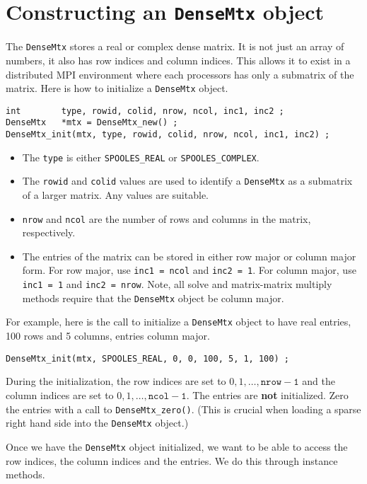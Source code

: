 \section{Constructing an {\tt DenseMtx} object}
\label{subsection:construct-DenseMtx}
\par
The {\tt DenseMtx} stores a real or complex dense matrix.
It is not just an array of numbers, it also has row indices and
column indices.
This allows it to exist in a distributed MPI environment where each
processors has only a submatrix of the matrix.
Here is how to initialize a {\tt DenseMtx} object.
\begin{verbatim}
int        type, rowid, colid, nrow, ncol, inc1, inc2 ;
DenseMtx   *mtx = DenseMtx_new() ;
DenseMtx_init(mtx, type, rowid, colid, nrow, ncol, inc1, inc2) ;
\end{verbatim}
\begin{itemize}
\item
The {\tt type} is either {\tt SPOOLES\_REAL} 
or {\tt SPOOLES\_COMPLEX}.
\item
The {\tt rowid} and {\tt colid} values are used to identify a 
{\tt DenseMtx} as a submatrix of a larger matrix.
Any values are suitable.
\item
{\tt nrow} and {\tt ncol} are the number of rows and columns in the
matrix, respectively.
\item
The entries of the matrix can be stored in either row major or
column major form.
For row major, use {\tt inc1 = ncol} and {\tt inc2 = 1}.
For column major, use {\tt inc1 = 1} and {\tt inc2 = nrow}.
Note, all solve and matrix-matrix multiply methods require that the
{\tt DenseMtx} object be column major.
\end{itemize}
For example, here is the call to initialize a {\tt DenseMtx} object 
to have real entries, 100 rows and 5 columns, entries column major.
\begin{verbatim}
DenseMtx_init(mtx, SPOOLES_REAL, 0, 0, 100, 5, 1, 100) ;
\end{verbatim}
During the initialization, 
the row indices are set to $0, 1, \dots, \mathtt{nrow - 1}$
and the column indices are set to $0, 1, \dots, \mathtt{ncol - 1}$.
The entries are {\bf not} initialized.
Zero the entries with a call to {\tt DenseMtx\_zero()}.
(This is crucial when loading a sparse right hand side into
the {\tt DenseMtx} object.)
\par
Once we have the {\tt DenseMtx} object initialized, we want to be
able to access the row indices, the column indices and the entries.
We do this through instance methods.
